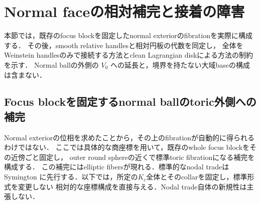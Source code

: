 \section{Normal faceの相対補完と接着の障害}
\label{ncc:section}

本節では，既存のfocus blockを固定したnormal exteriorのfibrationを実際に構成する．
その後，smooth relative handlesと相対円板の代数を同定し，
全体をWeinstein handlesのみで接続する方法とclean Lagrangian diskによる方法の制約を示す．
Normal ballの外側の $V_0$ への延長と，境界を持たない大域baseの構成は含まない．

\subsection{Focus blockを固定するnormal ballのtoric外側への補完}
\label{ncc:normal-completion-section}

Normal exteriorの位相を求めたことから，その上のfibrationが自動的に得られるわけではない．
ここでは具体的な商座標を用いて，既存のwhole focus blockをその近傍ごと固定し，
outer round sphereの近くで標準toric fibrationになる補完を構成する．
この補完にはelliptic fibersが現れる．標準的なnodal tradeは
Symington \cite[Section~6.1, Lemma~6.3 and Theorem~6.5]{symington}
に先行する．以下では，所定の$K_c$全体とそのcollarを固定し，標準形式を変更しない
相対的な座標構成を直接与える．Nodal trade自体の新規性は主張しない．

